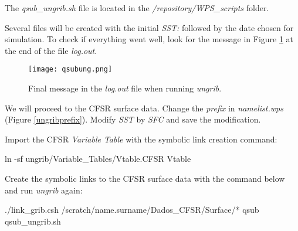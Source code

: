 \begin{tcolorbox}[enhanced,
  grow to left by=0cm,%
  grow to right by=0cm,%
  enlarge top by=0cm,%
  enlarge bottom by=0cm,%
  tcbox raise base,
  boxrule=1.0pt,
  left=18mm,
  colframe=yellow!50!black,coltext=yellow!25!black,colback=yellow!10!white,
  overlay={\begin{tcbclipinterior}\fill[yellow!75!blue!50!white] (frame.south west)
    rectangle node[text=white,font=\sffamily\bfseries\footnotesize,rotate=0] {ATTENTION} ([xshift=18mm]frame.north west);\end{tcbclipinterior}}]
    The \textit{qsub\_ungrib.sh} file is located in the \textit{/repository/WPS\_scripts} folder.
\end{tcolorbox}
\bigskip

\noindent Several files will be created with the initial \textit {SST:} followed by the date chosen for simulation. 
To check if everything went well, look for the message in Figure \textcolor{bleu_cite}{\ref{ungribsucess}} at the end of the file
\textit{log.out}.
\bigskip

\begin{figure}[H]
    \centering
    \texttt{[image: qsubung.png]}
    \caption{Final message in the \textit{log.out} file when running \textit{ungrib}.}
    \label{ungribsucess}
\end{figure}
\bigskip

\noindent We will proceed to the CFSR surface data. Change the \textit{prefix} in \textit{namelist.wps} (Figure \textcolor{bleu_cite}{\ref{ungribprefix}}). 
Modify \textit{SST} by \textit{SFC} and save the modification.

\bigskip

\noindent Import the CFSR \textit{Variable Table} with the symbolic link creation command:
\bigskip

\begin{bashcode}
ln -sf ungrib/Variable_Tables/Vtable.CFSR Vtable
\end{bashcode}
\bigskip

\noindent Create the symbolic links to the CFSR surface data with the command below and run \textit{ungrib} again:
\bigskip

\begin{bashcode}
./link_grib.csh /scratch/name.surname/Dados_CFSR/Surface/*
qsub qsub_ungrib.sh
\end{bashcode}
\bigskip

